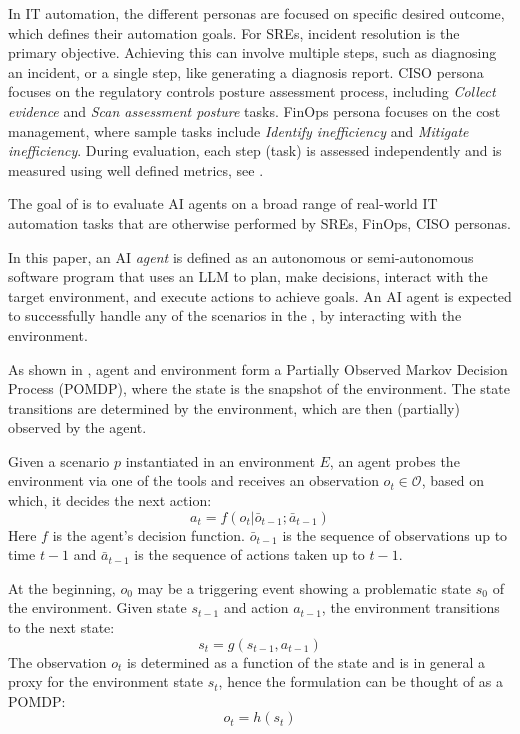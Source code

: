 
In IT automation, the different personas are focused on specific desired outcome, which defines their automation goals. 
For SREs, incident resolution is the primary objective. Achieving this can involve multiple steps, such as diagnosing an incident, or a single step, like generating a diagnosis report. CISO persona focuses on the regulatory controls posture assessment process, including \textit{Collect evidence} and \textit{Scan assessment posture} tasks. FinOps persona focuses on the cost management, where sample tasks include \textit{Identify inefficiency} and \textit{Mitigate inefficiency}. During evaluation, each step (task) is assessed independently and is measured using well defined metrics, see .

The goal of \bench is to evaluate AI agents on a broad range of real-world IT automation tasks that are otherwise performed by SREs, FinOps, CISO personas.

In this paper, an AI \textit{agent} is defined as an autonomous or semi-autonomous software program that uses an LLM to plan, make decisions, interact with the target environment, and execute actions to achieve goals.  An AI agent is expected to successfully handle any of the scenarios in the \bench, by interacting with the environment. 

As shown in , agent and environment form a Partially Observed Markov Decision Process (POMDP), where the state is the snapshot of the environment. The state transitions are determined by the environment, which are then (partially) observed by the agent. %

Given a scenario $p$ instantiated in an environment $E$, an agent probes the environment via one of the tools and receives an observation $o_t \in \mathcal{O}$, based on which, it decides the next action: 
\begin{equation}
    a_t  = f(o_t|\bar{o}_{t-1};\bar{a}_{t-1})
\end{equation}
Here $f$ is the agent's decision function. 
$\bar{o}_{t-1}$ is the sequence of observations up to time $t-1$ and $\bar{a}_{t-1}$ is the sequence of actions taken up to $t-1$.  

At the beginning, $o_0$ may be a triggering event showing a problematic state $s_0$ of the environment. Given state $s_{t-1}$ and action $a_{t-1}$, the environment transitions to the next state: 
\begin{equation}
    s_{t} = g(s_{t-1},a_{t-1})
\end{equation} 
The observation $o_t$ is determined as a function of the state and is in general a proxy for the environment state $s_t$, hence the formulation can be thought of as a POMDP: 
\begin{equation}
    o_t = h(s_t)
\end{equation}

